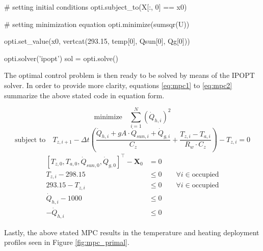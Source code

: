 \begin{python}
# setting initial conditions
opti.subject_to(X[:, 0] == x0)

# setting minimization equation
opti.minimize(sumsqr(U))

opti.set_value(x0, vertcat(293.15, temp[0], Qsun[0], Qg[0]))

opti.solver('ipopt')
sol = opti.solve()
\end{python}

The optimal control problem is then ready to be solved by means of the IPOPT solver. In order to provide more clarity, equations \ref{eq:mpc1} to \ref{eq:mpc2} summarize the above stated code in equation form.


\begin{equation}
{\text{minimize}} \hspace{1em} \sum_{i=1}^{N} \left(\dot{Q}_{h,i}\right)^2
\label{eq:mpc1}
\end{equation}
\begin{equation}
\text{subject to}  \hspace{1em} T_{z,i+1} - \Delta t \left( \frac{\dot{Q}_{h,i} + gA \cdot \dot{Q}_{sun, i} + \dot{Q}_{g,i}}{C_z} + \frac{T_{z,i}-T_{a,i}}{R_w \cdot C_z} \right) - T_{z,i} =0
\end{equation}
\vspace{-0.5em}
\begin{align}
\left[T_{z,0}, T_{a,0}, \dot{Q}_{sun,0}, \dot{Q}_{g,0}\right]^{\top}  - \boldsymbol{X}_0 &=  0 \\[0.5em]
T_{z,i} - 298.15 &\leq 0 \hspace{2em} \forall i \in \text{occupied}\\[0.5em]
293.15 - T_{z,i} &\leq 0 \hspace{2em} \forall i \in \text{occupied}\\[0.5em]
\dot{Q}_{h,i} - 1000 &\leq 0\\[0.5em]
-\dot{Q}_{h,i} &\leq 0
\label{eq:mpc2}
\end{align}

Lastly, the above stated MPC results in the temperature and heating deployment profiles seen in Figure \ref{fig:mpc_primal}.

